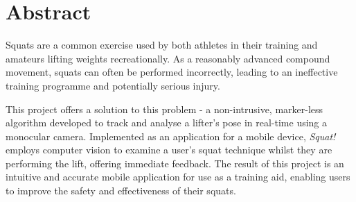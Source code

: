 \section*{Abstract}

Squats are a common exercise used by both athletes in their training and amateurs lifting weights recreationally. As a reasonably advanced compound movement, squats can often be performed incorrectly, leading to an ineffective training programme and potentially serious injury.

This project offers a solution to this problem - a non-intrusive, marker-less algorithm developed to track and analyse a lifter's pose in real-time using a monocular camera. Implemented as an application for a mobile device, \emph{Squat!} employs computer vision to examine a user's squat technique whilst they are performing the lift, offering immediate feedback. The result of this project is an intuitive and accurate mobile application for use as a training aid, enabling users to improve the safety and effectiveness of their squats.